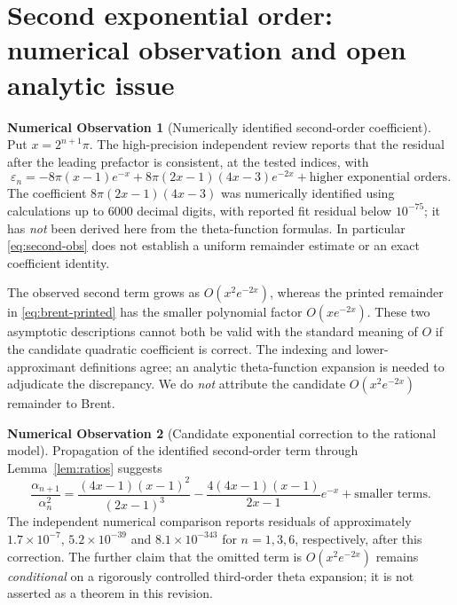 \documentclass[11pt]{article}
\theoremstyle{definition}\newtheorem{remark}{Remark}\newtheorem{observation}{Numerical Observation}
\begin{document}
\section{Second exponential order: numerical observation and open analytic issue}\label{sec:second}
\begin{observation}[Numerically identified second-order coefficient]\label{obs:second}
Put $x=2^{n+1}\pi$. The high-precision independent review reports that the residual after the leading prefactor is consistent, at the tested indices, with
\begin{equation}\label{eq:second-obs}
\varepsilon_n=-8\pi(x-1)e^{-x}
+8\pi(2x-1)(4x-3)e^{-2x}
+\text{higher exponential orders}.
\end{equation}
The coefficient $8\pi(2x-1)(4x-3)$ was numerically identified using calculations up to 6000 decimal digits, with reported fit residual below $10^{-75}$; it has \emph{not} been derived here from the theta-function formulas. In particular \eqref{eq:second-obs} does not establish a uniform remainder estimate or an exact coefficient identity.
\end{observation}
The observed second term grows as $O(x^2e^{-2x})$, whereas the printed remainder in \eqref{eq:brent-printed} has the smaller polynomial factor $O(xe^{-2x})$. These two asymptotic descriptions cannot both be valid with the standard meaning of $O$ if the candidate quadratic coefficient is correct. The indexing and lower-approximant definitions agree; an analytic theta-function expansion is needed to adjudicate the discrepancy. We do \emph{not} attribute the candidate $O(x^2e^{-2x})$ remainder to Brent.

\begin{observation}[Candidate exponential correction to the rational model]
Propagation of the identified second-order term through Lemma~\ref{lem:ratios} suggests
\begin{equation}\label{eq:candidate-refined}
\frac{\alpha_{n+1}}{\alpha_n^2}
=\frac{(4x-1)(x-1)^2}{(2x-1)^3}
-\frac{4(4x-1)(x-1)}{2x-1}e^{-x}
+\text{smaller terms}.
\end{equation}
The independent numerical comparison reports residuals of approximately $1.7\times10^{-7}$, $5.2\times10^{-39}$ and $8.1\times10^{-343}$ for $n=1,3,6$, respectively, after this correction. The further claim that the omitted term is $O(x^2e^{-2x})$ remains \emph{conditional} on a rigorously controlled third-order theta expansion; it is not asserted as a theorem in this revision.
\end{observation}
\end{document}
